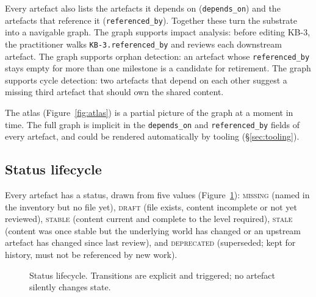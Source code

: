 \documentclass[11pt,a4paper,twocolumn]{article}
\begin{document}
Every artefact also lists the artefacts it depends on
(\texttt{depends\_on}) and the artefacts that reference it
(\texttt{referenced\_by}). Together these turn the substrate into a
navigable graph. The graph supports impact analysis: before editing
KB-3, the practitioner walks \texttt{KB-3.referenced\_by} and
reviews each downstream artefact. The graph supports orphan
detection: an artefact whose \texttt{referenced\_by} stays empty
for more than one milestone is a candidate for retirement. The
graph supports cycle detection: two artefacts that depend on each
other suggest a missing third artefact that should own the shared
content.

The atlas (Figure~\ref{fig:atlas}) is a partial picture of the
graph at a moment in time. The full graph is implicit in the
\texttt{depends\_on} and \texttt{referenced\_by} fields of every
artefact, and could be rendered automatically by tooling
(\S\ref{sec:tooling}).

\subsection{Status lifecycle}

Every artefact has a status, drawn from five values
(Figure~\ref{fig:status}): \textsc{missing} (named in the inventory
but no file yet), \textsc{draft} (file exists, content incomplete
or not yet reviewed), \textsc{stable} (content current and complete
to the level required), \textsc{stale} (content was once stable
but the underlying world has changed or an upstream artefact has
changed since last review), and \textsc{deprecated} (superseded;
kept for history, must not be referenced by new work).

\begin{figure}[t]
\centering
{}
\caption{Status lifecycle. Transitions are explicit and triggered;
no artefact silently changes state.}
\label{fig:status}
\end{figure}
\end{document}

